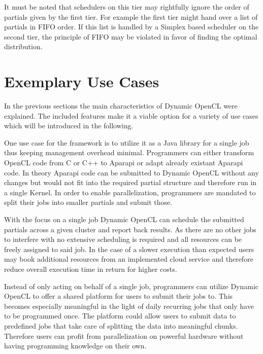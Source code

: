 It must be noted that schedulers on this tier may rightfully ignore the order of partials given by the first tier. For example the first tier might hand over a list of partials in FIFO order. If this list is handled by a Simplex based scheduler on the second tier, the principle of FIFO may be violated in favor of finding the optimal distribution.

\section{Exemplary Use Cases}

In the previous sections the main characteristics of Dynamic OpenCL were explained. The included features make it a viable option for a variety of use cases which will be introduced in the following.

\begin{description}[style=nextline]
	\item[Job Based Library]
	One use case for the framework is to utilize it as a Java library for a single job thus keeping management overhead minimal. Programmers can either transform OpenCL code from C or C++ to Aparapi or adapt already existant Aparapi code. In theory Aparapi code can be submitted to Dynamic OpenCL without any changes but would not fit into the required partial structure and therefore run in a single Kernel. In order to enable parallelization, programmers are mandated to split their jobs into smaller partials and submit those.
	
	With the focus on a single job Dynamic OpenCL can schedule the submitted partials across a given cluster and report back results. As there are no other jobs to interfere with no extensive scheduling is required and all resources can be freely assigned to said job. In the case of a slower execution than expected users may book additional resources from an implemented cloud service and therefore reduce overall execution time in return for higher costs.
	
	\item[Local Cluster Provider] 
	
	Instead of only acting on behalf of a single job, programmers can utilize Dynamic OpenCL to offer a shared platform for users to submit their jobs to. This becomes especially meaningful in the light of daily recurring jobs that only have to be programmed once. The platform could allow users to submit data to predefined jobs that take care of splitting the data into meaningful chunks. Therefore users can profit from parallelization on powerful hardware without having programming knowledge on their own.
	

\end{description}

